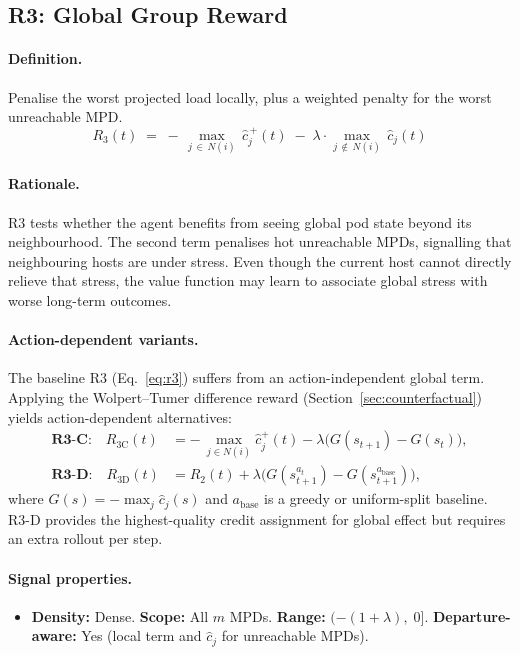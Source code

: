 \documentclass[11pt]{article}
\begin{document}
\subsection{R3: Global Group Reward}
\label{sec:r3}

\paragraph{Definition.}
Penalise the worst projected load locally, plus a weighted penalty for
the worst unreachable MPD.
\begin{equation}
\boxed{
  R_3(t)
  \;=\;
  -\,\max_{j \,\in\, N(i)}\, \hat{c}_j^{\,+}(t)
  \;-\;
  \lambda \cdot \max_{j \,\notin\, N(i)}\, \hat{c}_j(t)
}
\label{eq:r3}
\end{equation}

\paragraph{Rationale.}
R3 tests whether the agent benefits from seeing global pod state beyond
its neighbourhood.  The second term penalises hot unreachable MPDs,
signalling that neighbouring hosts are under stress.  Even though the
current host cannot directly relieve that stress, the value function may
learn to associate global stress with worse long-term outcomes.

\paragraph{Action-dependent variants.}
The baseline R3 (Eq.~\ref{eq:r3}) suffers from an action-independent
global term.  Applying the Wolpert--Tumer difference reward
(Section~\ref{sec:counterfactual}) yields action-dependent alternatives:
\begin{align}
\textbf{R3-C:}\quad
R_{3\text{C}}(t)
&=
-\,\max_{j \in N(i)} \hat{c}_j^{+}(t)
- \lambda \bigl(G(s_{t+1}) - G(s_t)\bigr),
\label{eq:r3c}
\\[4pt]
\textbf{R3-D:}\quad
R_{3\text{D}}(t)
&=
R_2(t)
+ \lambda \bigl(G(s_{t+1}^{a_t}) - G(s_{t+1}^{a_{\text{base}}})\bigr),
\label{eq:r3d}
\end{align}
where $G(s) = -\max_j \hat{c}_j(s)$ and $a_{\text{base}}$ is a greedy or
uniform-split baseline.  R3-D provides the highest-quality credit
assignment for global effect but requires an extra rollout per step.

\paragraph{Signal properties.}
\begin{itemize}
  \item \textbf{Density:} Dense. \quad \textbf{Scope:} All $m$ MPDs.
        \quad \textbf{Range:} $(-(1{+}\lambda),\; 0]$. \quad
        \textbf{Departure-aware:} Yes (local term and $\hat{c}_j$ for
        unreachable MPDs).
\end{itemize}
\end{document}
